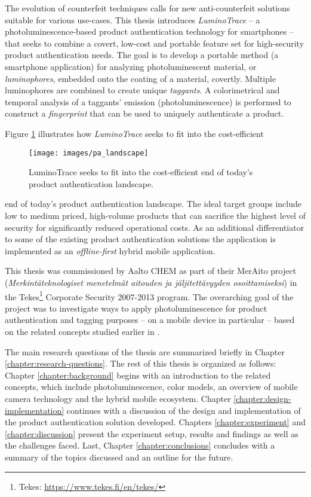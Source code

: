 \documentclass[thesis.tex]{subfiles}
\begin{document}
\enlargethispage{2\baselineskip}
The evolution of counterfeit techniques calls for new anti-counterfeit solutions suitable for various use-cases. This thesis introduces \emph{LuminoTrace} -- a photoluminescence-based product authentication technology for smartphones -- that seeks to combine a covert, low-cost and portable feature set for high-security product authentication needs. The goal is to develop a portable method (a smartphone application) for analyzing photoluminescent material, or \emph{luminophores}, embedded onto the coating of a material, covertly. Multiple luminophores are combined to create unique \emph{taggants}. A colorimetrical and temporal analysis of a taggants' emission (photoluminescence) is performed to construct a \emph{fingerprint} that can be used to uniquely authenticate a product.

Figure \ref{figure:production_authentication_landscape} illustrates how \emph{LuminoTrace} seeks to fit into the cost-efficient

\begin{figure}[h!]
\centering \texttt{[image: images/pa\_landscape]}
\vspace{-8mm}
\caption{LuminoTrace seeks to fit into the cost-efficient end of today's product authentication landscape.}
\label{figure:production_authentication_landscape}
\end{figure}

\noindent end of today's product authentication landscape. The ideal target groups include low to medium priced, high-volume products that can sacrifice the highest level of security for significantly reduced operational costs. As an additional differentiator to some of the existing product authentication solutions the application is implemented as an \emph{offline-first} hybrid mobile application.

This thesis was commissioned by Aalto CHEM as part of their MerAito project (\emph{Merkintäteknologiset menetelmät aitouden ja jäljitettävyyden osoittamiseksi}) in the Tekes\footnote{Tekes: \url{https://www.tekes.fi/en/tekes/}} Corporate Security 2007-2013 program. The overarching goal of the project was to investigate ways to apply photoluminescence for product authentication and tagging purposes -- on a mobile device in particular -- based on the related concepts studied earlier in \cite{kuosmanen}.

The main research questions of the thesis are summarized briefly in Chapter \ref{chapter:research-questions}. The rest of this thesis is organized as follows: Chapter \ref{chapter:background} begins with an introduction to the related concepts, which include photoluminescence, color models, an overview of mobile camera technology and the hybrid mobile ecosystem. Chapter \ref{chapter:design-implementation} continues with a discussion of the design and implementation of the product authentication solution developed. Chapters \ref{chapter:experiment} and \ref{chapter:discussion} present the experiment setup, results and findings as well as the challenges faced. Last, Chapter \ref{chapter:conclusions} concludes with a summary of the topics discussed and an outline for the future.
\end{document}
